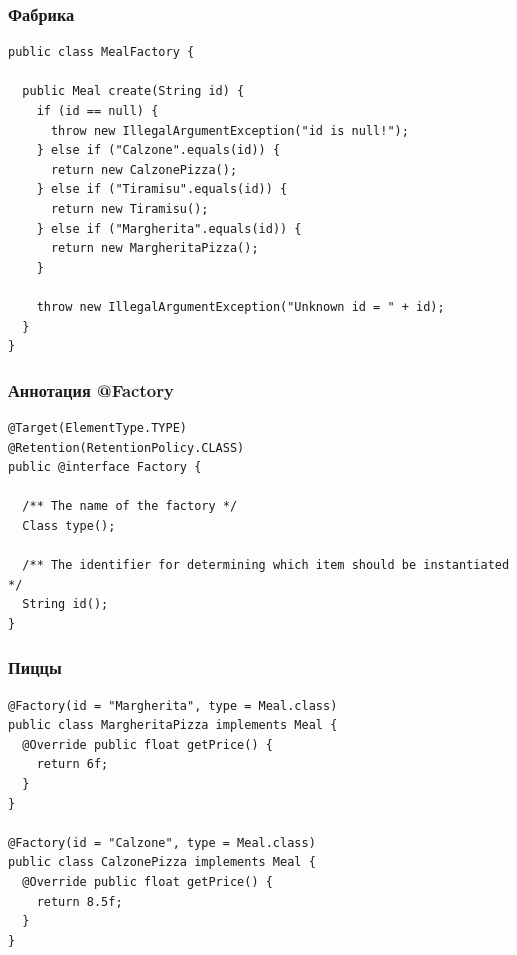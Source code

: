 \documentclass[xetex,mathserif,serif]{beamer}
\begin{document}
	\begin{frame}[fragile]
		\frametitle{Фабрика}
		\begin{small}
			\begin{verbatim}
public class MealFactory {

  public Meal create(String id) {
    if (id == null) {
      throw new IllegalArgumentException("id is null!");
    } else if ("Calzone".equals(id)) {
      return new CalzonePizza();
    } else if ("Tiramisu".equals(id)) {
      return new Tiramisu();
    } else if ("Margherita".equals(id)) {
      return new MargheritaPizza();
    }

    throw new IllegalArgumentException("Unknown id = " + id);
  }
}
			\end{verbatim}
		\end{small}
\end{frame}

	\begin{frame}[fragile]
		\frametitle{Аннотация @Factory}
		\begin{small}
			\begin{verbatim}
@Target(ElementType.TYPE) 
@Retention(RetentionPolicy.CLASS)
public @interface Factory {

  /** The name of the factory */
  Class type();

  /** The identifier for determining which item should be instantiated */
  String id();
}
			\end{verbatim}
		\end{small}
\end{frame}

	\begin{frame}[fragile]
		\frametitle{Пиццы}
		\begin{small}
			\begin{verbatim}
@Factory(id = "Margherita", type = Meal.class)
public class MargheritaPizza implements Meal {
  @Override public float getPrice() {
    return 6f;
  }
}

@Factory(id = "Calzone", type = Meal.class)
public class CalzonePizza implements Meal {
  @Override public float getPrice() {
    return 8.5f;
  }
}
			\end{verbatim}
		\end{small}
\end{frame}
\end{document}
